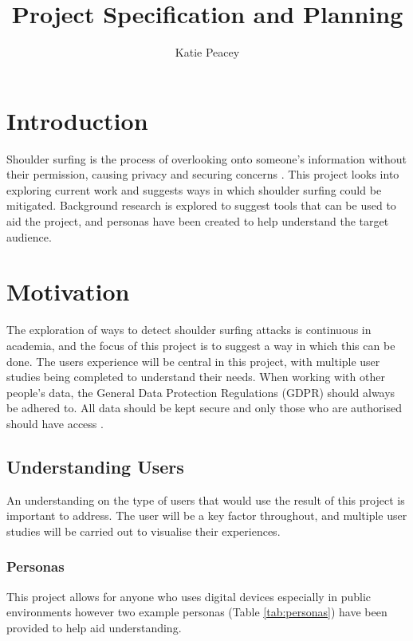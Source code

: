 \documentclass[12pt]{article}
\title{ Project Specification and Planning}
\author{Katie Peacey}
\theoremstyle{plain}
\theoremstyle{definition}
\begin{document}
\maketitle

\tableofcontents

\listoffigures
\listoftables
\clearpage


\section{Introduction}
\label{sec:intro}

Shoulder surfing is the process of overlooking onto someone’s information without their permission, causing privacy and securing concerns \cite{eiband_understanding_2017}. This project looks into exploring current work and suggests ways in which shoulder surfing could be mitigated. Background research is explored to suggest tools that can be used to aid the project, and personas have been created to help understand the target audience.

\section{Motivation}
\label{sec:motivation} 

The exploration of ways to detect shoulder surfing attacks is continuous in academia, and the focus of this project is to suggest a way in which this can be done. The users experience will be central in this project, with multiple user studies being completed to understand their needs.
When working with other people's data, the General Data Protection Regulations (GDPR) \cite{noauthor_data_nodate} should always be adhered to. All data should be kept secure and only those who are authorised should have access \cite{noauthor_data_nodate}.

\subsection{Understanding Users}
An understanding on the type of users that would use the result of this project is important to address. The user will be a key factor throughout, and multiple user studies will be carried out to visualise their experiences.

\subsubsection{Personas}
This project allows for anyone who uses digital devices especially in public environments however two example personas (Table \ref{tab:personas}) have been provided to help aid understanding.
\end{document}
